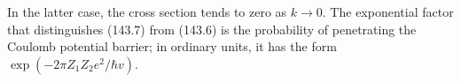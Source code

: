In the latter case, the cross section tends to zero as $k\to0$. The exponential factor that distinguishes (143.7) from (143.6) is the probability of penetrating the Coulomb potential barrier; in ordinary units, it has the form $\exp(-2\pi Z_1Z_2e^2/\hbar v)$.
